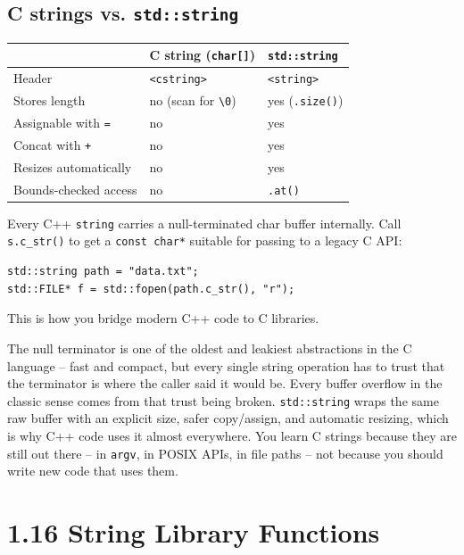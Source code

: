 \documentclass[11pt]{article}
\begin{document}
\subsection{C strings vs. \texttt{std::string}}

\begin{center}
\begin{tabular}{lll}
& \textbf{C string} (\texttt{char[]}) & \texttt{std::string} \\
\hline
Header & \texttt{<cstring>} & \texttt{<string>} \\
Stores length & no (scan for \texttt{\textbackslash0}) & yes (\texttt{.size()}) \\
Assignable with \texttt{=} & no & yes \\
Concat with \texttt{+} & no & yes \\
Resizes automatically & no & yes \\
Bounds-checked access & no & \texttt{.at()} \\
\end{tabular}
\end{center}

\begin{notebox}
Every C++ \texttt{string} carries a null-terminated char buffer
internally. Call \texttt{s.c\_str()} to get a \texttt{const char*}
suitable for passing to a legacy C API:
\begin{verbatim}
std::string path = "data.txt";
std::FILE* f = std::fopen(path.c_str(), "r");
\end{verbatim}
This is how you bridge modern C++ code to C libraries.
\end{notebox}

\begin{ideabox}
The null terminator is one of the oldest and leakiest abstractions in
the C language -- fast and compact, but every single string operation
has to trust that the terminator is where the caller said it would be.
Every buffer overflow in the classic sense comes from that trust being
broken. \texttt{std::string} wraps the same raw buffer with an explicit
size, safer copy/assign, and automatic resizing, which is why C++ code
uses it almost everywhere. You learn C strings because they are still
out there -- in \texttt{argv}, in POSIX APIs, in file paths -- not
because you should write new code that uses them.
\end{ideabox}

\section{1.16 String Library Functions}
\end{document}
